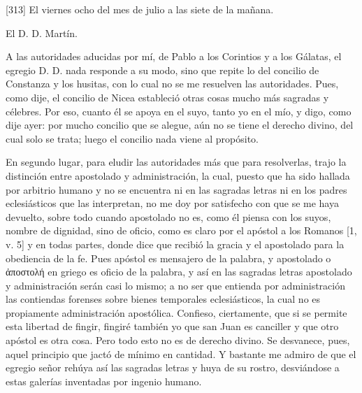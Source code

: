 [313] El viernes ocho del mes de julio a las siete de la mañana.

El D. D. Martín.

A las autoridades aducidas por mí, de Pablo a los Corintios y a los Gálatas, el egregio D. D. nada responde a su modo, sino que repite lo del concilio de Constanza y los husitas, con lo cual no se me resuelven las autoridades. Pues, como dije, el concilio de Nicea estableció otras cosas mucho más sagradas y célebres. Por eso, cuanto él se apoya en el suyo, tanto yo en el mío, y digo, como dije ayer: por mucho concilio que se alegue, aún no se tiene el derecho divino, del cual solo se trata; luego el concilio nada viene al propósito.

En segundo lugar, para eludir las autoridades más que para resolverlas, trajo la distinción entre apostolado y administración, la cual, puesto que ha sido hallada por arbitrio humano y no se encuentra ni en las sagradas letras ni en los padres eclesiásticos que las interpretan, no me doy por satisfecho con que se me haya devuelto, sobre todo cuando apostolado no es, como él piensa con los suyos, nombre de dignidad, sino de oficio, como es claro por el apóstol a los Romanos [1, v. 5] y en todas partes, donde dice que recibió la gracia y el apostolado para la obediencia de la fe. Pues apóstol es mensajero de la palabra, y apostolado o ἀποστολή en griego es oficio de la palabra, y así en las sagradas letras apostolado y administración serán casi lo mismo; a no ser que entienda por administración las contiendas forenses sobre bienes temporales eclesiásticos, la cual no es propiamente administración apostólica. Confieso, ciertamente, que si se permite esta libertad de fingir, fingiré también yo que san Juan es canciller y que otro apóstol es otra cosa. Pero todo esto no es de derecho divino. Se desvanece, pues, aquel principio que jactó de mínimo en cantidad. Y bastante me admiro de que el egregio señor rehúya así las sagradas letras y huya de su rostro, desviándose a estas galerías inventadas por ingenio humano.

